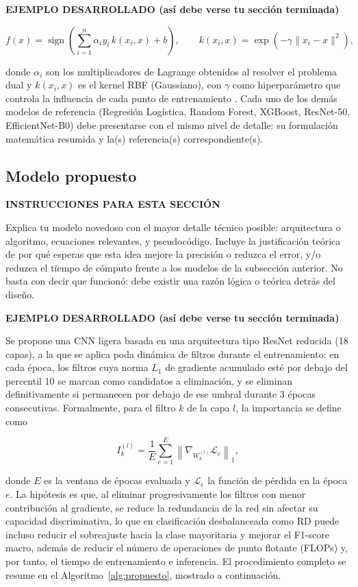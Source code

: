 \documentclass[pdflatex,sn-mathphys-num]{sn-jnl}
\newenvironment{instruccion}{%
  \par\noindent\textbf{\color{blue!55!black}INSTRUCCIONES PARA ESTA SECCIÓN}%
  \par\vspace{2pt}\noindent\itshape\small
}{%
  \par\normalfont\vspace{6pt}
}
\newenvironment{ejemplo}{%
  \par\noindent\textbf{\color{green!35!black}EJEMPLO DESARROLLADO (así debe verse tu sección terminada)}%
  \par\vspace{2pt}\noindent\small
}{%
  \par\normalfont\vspace{6pt}
}
\begin{document}
\begin{ejemplo}
\begin{equation}
f(x) = \operatorname{sign}\left(\sum_{i=1}^{n} \alpha_i y_i \, k(x_i, x) + b\right), \qquad k(x_i, x) = \exp\left(-\gamma \lVert x_i - x \rVert^2\right),
\label{eq:svm_dual}
\end{equation}

\noindent donde $\alpha_i$ son los multiplicadores de Lagrange obtenidos al resolver el problema dual y $k(x_i, x)$ es el kernel RBF (Gaussiano), con $\gamma$ como hiperparámetro que controla la influencia de cada punto de entrenamiento \cite{bib6}. Cada uno de los demás modelos de referencia (Regresión Logística, Random Forest, XGBoost, ResNet-50, EfficientNet-B0) debe presentarse con el mismo nivel de detalle: su formulación matemática resumida y la(s) referencia(s) correspondiente(s).
\end{ejemplo}

\subsection{Modelo propuesto}\label{subsec:propuesto}

\begin{instruccion}
Explica tu modelo novedoso con el mayor detalle técnico posible: arquitectura o algoritmo, ecuaciones relevantes, y pseudocódigo. Incluye la justificación teórica de por qué esperas que esta idea mejore la precisión o reduzca el error, y/o reduzca el tiempo de cómputo frente a los modelos de la subsección anterior. No basta con decir que funcionó: debe existir una razón lógica o teórica detrás del diseño.
\end{instruccion}

\begin{ejemplo}
Se propone una CNN ligera basada en una arquitectura tipo ResNet reducida (18 capas), a la que se aplica poda dinámica de filtros durante el entrenamiento: en cada época, los filtros cuya norma $L_1$ de gradiente acumulado esté por debajo del percentil 10 se marcan como candidatos a eliminación, y se eliminan definitivamente si permanecen por debajo de ese umbral durante 3 épocas consecutivas. Formalmente, para el filtro $k$ de la capa $l$, la importancia se define como

\begin{equation}
I^{(l)}_k = \frac{1}{E}\sum_{e=1}^{E}\left\lVert \nabla_{W^{(l)}_k} \mathcal{L}_e \right\rVert_1,
\label{eq:importancia}
\end{equation}

\noindent donde $E$ es la ventana de épocas evaluada y $\mathcal{L}_e$ la función de pérdida en la época $e$. La hipótesis es que, al eliminar progresivamente los filtros con menor contribución al gradiente, se reduce la redundancia de la red sin afectar su capacidad discriminativa, lo que en clasificación desbalanceada como RD puede incluso reducir el sobreajuste hacia la clase mayoritaria y mejorar el F1-score macro, además de reducir el número de operaciones de punto flotante (FLOPs) y, por tanto, el tiempo de entrenamiento e inferencia. El procedimiento completo se resume en el Algoritmo~\ref{alg:propuesto}, mostrado a continuación.
\end{ejemplo}
\end{document}
